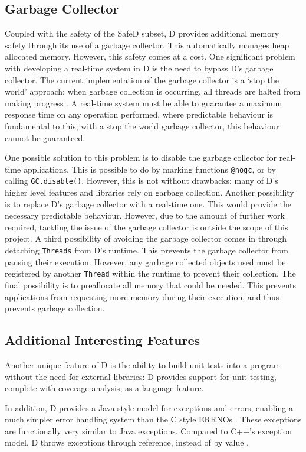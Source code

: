 \subsection{Garbage Collector}
Coupled with the safety of the SafeD subset, D provides additional memory
safety through its use of a garbage collector. This
automatically manages heap allocated memory. 
However, this safety comes at a cost. One significant problem with developing a 
real-time system in D is the need to bypass D's garbage collector. 
The current implementation of the garbage 
collector is a `stop the world' approach: when garbage collection is occurring, 
all threads are halted from making progress 
\cite{dlang-garbage}. A real-time system must be able
to guarantee a maximum response time on any operation performed, 
where predictable behaviour is fundamental to this; 
with a stop the world garbage collector, this behaviour cannot be guaranteed. 
\par\bigskip\noindent
One possible solution to this problem is to disable the garbage collector for 
real-time applications. This is possible to do by marking functions \texttt{@nogc}, 
or by calling \texttt{GC.disable()}. However, this is not without drawbacks: 
many of D's higher level features and libraries rely on garbage collection. 
Another possibility is to replace D's garbage collector with a real-time 
one. This would provide the necessary predictable behaviour. 
However, due to the amount of further work required, tackling the issue of the garbage 
collector is outside the scope of this project.
A third possibility of avoiding the garbage collector comes in through
detaching \texttt{Threads} from D's runtime. This prevents the garbage collector from
pausing their execution. However, any garbage collected objects used must be registered
by another \texttt{Thread} within the runtime to prevent their collection. 
The final possibility is to preallocate all memory that could be needed. This 
prevents applications from requesting more memory during their execution, and 
thus prevents garbage collection. 

\subsection{Additional Interesting Features}
Another unique feature of D is the ability to build unit-tests into a 
program without the need for external libraries: D provides support for 
unit-testing, complete with coverage analysis, as a language feature. 
\par\bigskip\noindent
In addition, D provides a Java style model for exceptions and errors, enabling 
a much simpler error handling system than the C style ERRNOs 
\cite{ddili-book}. 
These exceptions are functionally very similar to Java exceptions. Compared to
C++'s exception model, D throws exceptions through reference, instead of by
value \cite{interface-to-cpp}. 

